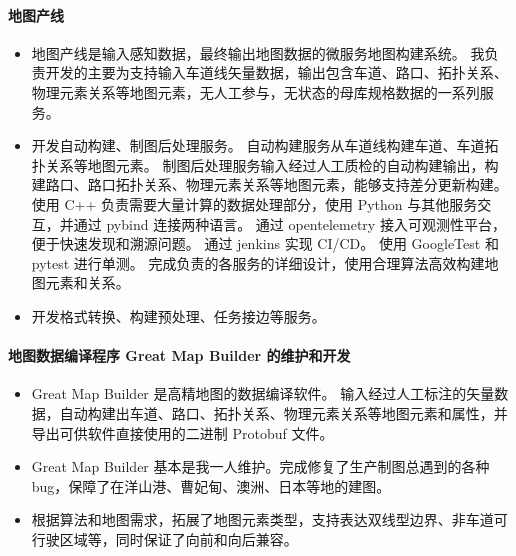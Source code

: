     \paragraph{地图产线}
        \begin{itemize}
            \item 
                地图产线是输入感知数据，最终输出地图数据的微服务地图构建系统。
                我负责开发的主要为支持输入车道线矢量数据，输出包含车道、路口、拓扑关系、物理元素关系等地图元素，无人工参与，无状态的母库规格数据的一系列服务。
            \item 
                开发自动构建、制图后处理服务。
                自动构建服务从车道线构建车道、车道拓扑关系等地图元素。
                制图后处理服务输入经过人工质检的自动构建输出，构建路口、路口拓扑关系、物理元素关系等地图元素，能够支持差分更新构建。
                使用 C++ 负责需要大量计算的数据处理部分，使用 Python 与其他服务交互，并通过 pybind 连接两种语言。
                通过 opentelemetry 接入可观测性平台，便于快速发现和溯源问题。
                通过 jenkins 实现 CI/CD。
                使用 GoogleTest 和 pytest 进行单测。
                完成负责的各服务的详细设计，使用合理算法高效构建地图元素和关系。
            \item 
                开发格式转换、构建预处理、任务接边等服务。
        \end{itemize}

    \paragraph{地图数据编译程序 Great Map Builder 的维护和开发}
        \begin{itemize}
            \item 
                Great Map Builder 是高精地图的数据编译软件。
                输入经过人工标注的矢量数据，自动构建出车道、路口、拓扑关系、物理元素关系等地图元素和属性，并导出可供软件直接使用的二进制 Protobuf 文件。
            \item 
                Great Map Builder 基本是我一人维护。完成修复了生产制图总遇到的各种 bug，保障了在洋山港、曹妃甸、澳洲、日本等地的建图。
            \item 
                根据算法和地图需求，拓展了地图元素类型，支持表达双线型边界、非车道可行驶区域等，同时保证了向前和向后兼容。
        \end{itemize}

